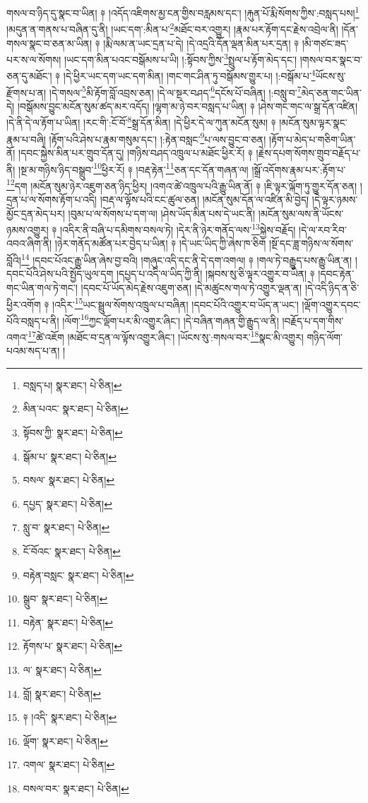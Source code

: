 གསལ་བ་ཉིད་དུ་སྣང་བ་ཡིན། ༈ །འདོད་འཇིགས་མྱ་ངན་གྱིས་བརླམས་དང་། །རྐུན་པོ་རྨི་སོགས་ཀྱིས་:བསླད་པས།\footnote{བསླད་པ།  སྣར་ཐང་།  པེ་ཅིན། } །མདུན་ན་གནས་པ་བཞིན་དུ་ནི། །ཡང་དག་:མིན་པ་\footnote{མིན་པའང་  སྣར་ཐང་།  པེ་ཅིན། }མཐོང་བར་འགྱུར། །རྣམ་པར་རྟོག་དང་རྗེས་འབྲེལ་ནི། །དོན་གསལ་སྣང་བ་ཅན་མ་ཡིན། ༈ །རྨི་ལམ་ན་ཡང་དྲན་པ་དེ། །དེ་འདྲའི་དོན་ལྡན་མིན་པར་དྲན། ༈ །མི་གཙང་ཟད་པར་ས་ལ་སོགས། །ཡང་དག་མིན་པའང་བསྒོམས་པ་ཡི། །:སྟོབས་ཀྱིས་\footnote{སྟོབས་ཀྱི་  སྣར་ཐང་།  པེ་ཅིན། }སྤྲུལ་པ་རྟོག་མེད་དང་། །གསལ་བར་སྣང་བ་ཅན་དུ་མཐོང་། ༈ །དེ་ཕྱིར་ཡང་དག་ཡང་དག་མིན། །གང་གང་ཤིན་ཏུ་བསྒོམས་གྱུར་པ། །:བསྒོམ་པ་\footnote{སྒོམ་པ་  སྣར་ཐང་།  པེ་ཅིན། }ཡོངས་སུ་རྫོགས་པ་ན། །དེ་གསལ་\footnote{བསལ་  སྣར་ཐང་།  པེ་ཅིན། }མི་རྟོག་བློ་འབྲས་ཅན། །དེ་ལ་སྔར་བཤད་\footnote{དཔྱད་  སྣར་ཐང་།  པེ་ཅིན། }དངོས་པོ་བཞིན། །:བསླུ་བ་\footnote{སླུ་བ་  སྣར་ཐང་།  པེ་ཅིན། }མེད་ཅན་གང་ཡིན་དེ། །བསྒོམས་བྱུང་མངོན་སུམ་ཚད་མར་འདོད། །ལྷག་མ་ཉེ་བར་བསླད་པ་ཡིན། ༈ །ཤེས་གང་གང་ལ་སྒྲ་དོན་འཛིན། །དེ་ནི་དེ་ལ་རྟོག་པ་ཡིན། །རང་གི་:ངོ་བོ་\footnote{ངོ་བོའང་  སྣར་ཐང་།  པེ་ཅིན། }སྒྲ་དོན་མིན། །དེ་ཕྱིར་དེ་ལ་ཀུན་མངོན་སུམ། ༈ །མངོན་སུམ་ལྟར་སྣང་རྣམ་པ་བཞི། །རྟོག་པའི་ཤེས་པ་རྣམ་གསུམ་དང་། །:རྟེན་བསླང་\footnote{བརྟེན་བསླང་  སྣར་ཐང་།  པེ་ཅིན། }པ་ལས་བྱུང་བ་ཅན། །རྟོག་པ་མེད་པ་གཅིག་ཡིན་ནོ། །དབང་སྐྱེས་མིན་པར་གྲུབ་དོན་དུ། །གཉིས་བཤད་འཁྲུལ་པ་མཐོང་ཕྱིར་རོ། ༈ །རྗེས་དཔག་སོགས་གྲུབ་བརྗོད་པ་ནི། །སྔ་མ་གཉིས་ཉིད་བསྒྲུབ་\footnote{སྒྲུབ་  སྣར་ཐང་།  པེ་ཅིན། }ཕྱིར་རོ། ༈ །བརྡ་རྟེན་\footnote{བརྟེན་  སྣར་ཐང་།  པེ་ཅིན། }ཅན་དང་དོན་གཞན་ལ། །སྒྲོ་འདོགས་རྣམ་པར་:རྟོག་པ་\footnote{རྟོགས་པ་  སྣར་ཐང་།  པེ་ཅིན། }དག །མངོན་སུམ་ཉེར་འཇུག་ཅན་ཉིད་ཕྱིར། །འགའ་ཚེ་འཁྲུལ་པའི་རྒྱུ་ཡིན་ནོ། ༈ །ཇི་ལྟར་ལྐོག་ཏུ་གྱུར་དོན་ཅན། །དྲན་པ་ལ་སོགས་རྟོག་པ་འདི། །བརྡ་ལ་ལྟོས་པའི་ངང་ཚུལ་ཅན། །མངོན་སུམ་དོན་ལ་འཛིན་མི་བྱེད། །དེ་ལྟར་ཉམས་མྱོང་དྲན་མེད་པར། །བུམ་པ་ལ་སོགས་པ་དག་ལ། །ཤེས་ཡོད་མིན་པས་དེ་ཡང་ནི། །མངོན་སུམ་ལས་ནི་ཡོངས་ཉམས་འགྱུར། ༈ །འདིར་ནི་བཞི་པ་དམིགས་བསལ་ཏེ། །དེར་ནི་ཉེར་གནོད་ལས་\footnote{ལ་  སྣར་ཐང་།  པེ་ཅིན། }སྐྱེས་བརྗོད། །དེ་ལ་རབ་རིབ་འབའ་ཞིག་ནི། །ཉེར་གནོད་མཚོན་པར་བྱེད་པ་ཡིན། ༈ །དེ་ཡང་ཡིད་ཀྱི་ཞེས་ཁ་ཅིག །སྔོ་དང་ཟླ་གཉིས་ལ་སོགས་བློའི།\footnote{བློ།  སྣར་ཐང་།  པེ་ཅིན། } །དབང་པོའང་རྒྱུ་ཡིན་ཞེས་བྱ་བའི། །གཞུང་འདི་དང་ནི་དེ་དག་འགལ། ༈ །གལ་ཏེ་བརྒྱུད་པས་རྒྱུ་ཡིན་ན། །དབང་པོའི་ཤེས་པའི་སྤྱོད་ཡུལ་དག །དཔྱད་པ་འདི་ལ་ཡིད་ཀྱི་ནི། །སྐབས་སུ་ཅི་ལྟར་འགྱུར་བ་ཡིན། ༈ །དབང་རྟེན་གང་ཡིན་གལ་ཏེ་གང་། །དབང་པོ་ཡོད་མེད་རྗེས་འཇུག་ཅན། །དེ་མཚུངས་གལ་ཏེ་འགྱུར་ལྡན་ན། །དེ་འདི་ཉིད་ན་ཅི་ཕྱིར་འགོག ༈ །འདིར་\footnote{༈ །འདི་  སྣར་ཐང་།  པེ་ཅིན། }ཡང་སྦྲུལ་སོགས་འཁྲུལ་པ་བཞིན། །དབང་པོའི་འགྱུར་བ་ཡོད་ན་ཡང་། །ལྡོག་འགྱུར་དབང་པོའི་བསླད་པ་ནི། །ལོག་\footnote{ལྡོག་  སྣར་ཐང་།  པེ་ཅིན། }ཀྱང་ལྡོག་པར་མི་འགྱུར་ཞིང་། །དེ་བཞིན་གཞན་གྱི་རྒྱུད་ལ་ནི། །བརྗོད་པ་དག་གིས་འགའ་\footnote{འགལ་  སྣར་ཐང་།  པེ་ཅིན། }ཚེ་འཇོག །མཐོང་བ་དྲན་ལ་ལྟོས་འགྱུར་ཞིང་། །ཡོངས་སུ་:གསལ་བར་\footnote{བསལ་བར་  སྣར་ཐང་།  པེ་ཅིན། }སྣང་མི་འགྱུར། གཉིད་ལོག་པའམ་སད་པ་ན། །
